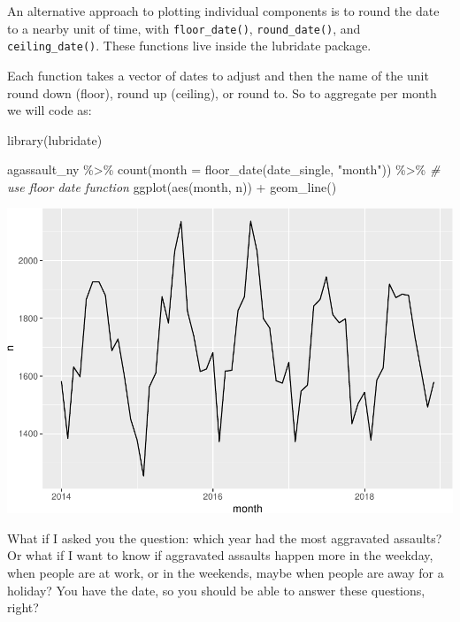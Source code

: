 \documentclass[
]{book}
\makeatletter
\newenvironment{Shaded}{\begin{snugshade}}{\end{snugshade}}
\newcommand{\AttributeTok}[1]{\textcolor[rgb]{0.61,0.61,0.61}{#1}}
\newcommand{\CommentTok}[1]{\textcolor[rgb]{0.37,0.37,0.37}{\textit{#1}}}
\newcommand{\FunctionTok}[1]{\textcolor[rgb]{0,0,0}{#1}}
\newcommand{\NormalTok}[1]{#1}
\newcommand{\SpecialCharTok}[1]{\textcolor[rgb]{0,0,0}{#1}}
\newcommand{\StringTok}[1]{\textcolor[rgb]{0.5,0.5,0.5}{#1}}
\newenvironment{kframe}{%
\medskip{}
\setlength{\fboxsep}{.8em}
 \def\at@end@of@kframe{}%
 \ifinner\ifhmode%
  \def\at@end@of@kframe{\end{minipage}}%
  \begin{minipage}{\columnwidth}%
 \fi\fi%
 \def\FrameCommand##1{\hskip\@totalleftmargin \hskip-\fboxsep
 \colorbox{shadecolor}{##1}\hskip-\fboxsep
     \hskip-\linewidth \hskip-\@totalleftmargin \hskip\columnwidth}%
 \MakeFramed {\advance\hsize-\width
   \@totalleftmargin\z@ \linewidth\hsize
   \@setminipage}}%
 {\par\unskip\endMakeFramed%
 \at@end@of@kframe}
\renewenvironment{Shaded}{\begin{kframe}}{\end{kframe}}
\makeatother
\begin{document}
An alternative approach to plotting individual components is to round the date to a nearby unit of time, with \texttt{floor\_date()}, \texttt{round\_date()}, and \texttt{ceiling\_date()}. These functions live inside the lubridate package.

Each function takes a vector of dates to adjust and then the name of the unit round down (floor), round up (ceiling), or round to. So to aggregate per month we will code as:

\begin{Shaded}
\begin{Highlighting}[]
\FunctionTok{library}\NormalTok{(lubridate)}

\NormalTok{agassault\_ny }\SpecialCharTok{\%\textgreater{}\%} 
  \FunctionTok{count}\NormalTok{(}\AttributeTok{month =} \FunctionTok{floor\_date}\NormalTok{(date\_single, }\StringTok{"month"}\NormalTok{)) }\SpecialCharTok{\%\textgreater{}\%} \CommentTok{\# use floor date function}
  \FunctionTok{ggplot}\NormalTok{(}\FunctionTok{aes}\NormalTok{(month, n)) }\SpecialCharTok{+}
    \FunctionTok{geom\_line}\NormalTok{()}
\end{Highlighting}
\end{Shaded}

\includegraphics{crime_mapping_files/figure-latex/ggplot_rounding_8b-1.pdf}

What if I asked you the question: which year had the most aggravated assaults? Or what if I want to know if aggravated assaults happen more in the weekday, when people are at work, or in the weekends, maybe when people are away for a holiday? You have the date, so you should be able to answer these questions, right?
\end{document}
